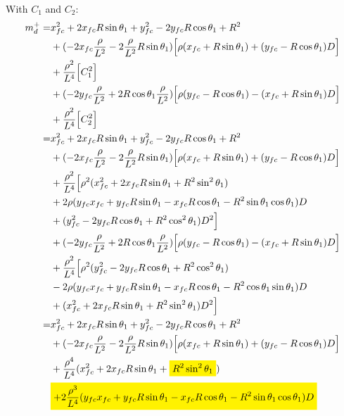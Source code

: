 \documentclass[12pt]{article}
\newcommand{\mathcolorbox}[2]{\colorbox{#1}{$\displaystyle #2$}}
\begin{document}
With $C_1$ and $C_2$:
\begin{align}
    m_d^+=& x_{fc}^2 +2x_{fc}R\sin\theta_1 + y_{fc}^2 -2y_{fc}R\cos\theta_1 + R^2 \nonumber\\
    &+ (-2x_{fc}\frac{\rho}{L^2} -2\frac{\rho}{L^2}R\sin\theta_1)\Bigl[\rho(x_{fc} + R\sin\theta_1) + (y_{fc}-R\cos\theta_1)D\Bigr] \nonumber\\
    &+ \frac{\rho^2}{L^4}\Bigl[C_1^2\Bigr] \nonumber\\
    &+ (-2y_{fc}\frac{\rho}{L^2} +2R\cos\theta_1\frac{\rho}{L^2})\Bigl[\rho(y_{fc}-R\cos\theta_1) - (x_{fc} + R\sin\theta_1)D\Bigr] \nonumber\\
    &+ \frac{\rho^2}{L^4}\Bigl[C_2^2\Bigr]\\
    =&  x_{fc}^2 +2x_{fc}R\sin\theta_1 + y_{fc}^2 -2y_{fc}R\cos\theta_1 + R^2 \nonumber\\
    &+ (-2x_{fc}\frac{\rho}{L^2} -2\frac{\rho}{L^2}R\sin\theta_1)\Bigl[\rho(x_{fc} + R\sin\theta_1) + (y_{fc}-R\cos\theta_1)D\Bigr] \nonumber\\
    &+ \frac{\rho^2}{L^4}\Bigl[  \rho^2(x_{fc}^2 + 2x_{fc}R\sin\theta_1 + R^2\sin^2\theta_1) \nonumber\\
    &+ 2\rho(y_{fc}x_{fc} + y_{fc}R\sin\theta_1 -x_{fc}R\cos\theta_1 - R^2\sin\theta_1\cos\theta_1)D \nonumber\\
    &+ (y_{fc}^2 -2y_{fc}R\cos\theta_1 + R^2\cos^2\theta_1)D^2  \Bigr] \nonumber\\
    &+ (-2y_{fc}\frac{\rho}{L^2} +2R\cos\theta_1\frac{\rho}{L^2})\Bigl[\rho(y_{fc}-R\cos\theta_1) - (x_{fc} + R\sin\theta_1)D\Bigr] \nonumber\\
    &+ \frac{\rho^2}{L^4}\Bigl[   \rho^2(y_{fc}^2 -2y_{fc}R\cos\theta_1 + R^2\cos^2\theta_1) \nonumber\\
    &- 2\rho(y_{fc}x_{fc} + y_{fc}R\sin\theta_1 -x_{fc}R\cos\theta_1 -R^2\cos\theta_1\sin\theta_1)D \nonumber\\
    &+(x_{fc}^2 + 2x_{fc}R\sin\theta_1 + R^2\sin^2\theta_1)D^2   \Bigr]\\
    =&  x_{fc}^2 +2x_{fc}R\sin\theta_1 + y_{fc}^2 -2y_{fc}R\cos\theta_1 + R^2 \nonumber\\
    &+ (-2x_{fc}\frac{\rho}{L^2} -2\frac{\rho}{L^2}R\sin\theta_1)\Bigl[\rho(x_{fc} + R\sin\theta_1) + (y_{fc}-R\cos\theta_1)D\Bigr] \nonumber\\
    &+  \frac{\rho^4}{L^4}(x_{fc}^2 + 2x_{fc}R\sin\theta_1 + \mathcolorbox{yellow}{ R^2\sin^2\theta_1 } ) \nonumber\\
    &\mathcolorbox{yellow}{  + 2\frac{\rho^3}{L^4}(y_{fc}x_{fc} + y_{fc}R\sin\theta_1 -x_{fc}R\cos\theta_1 - R^2\sin\theta_1\cos\theta_1)D  } \nonumber\\

\end{align}
\end{document}
